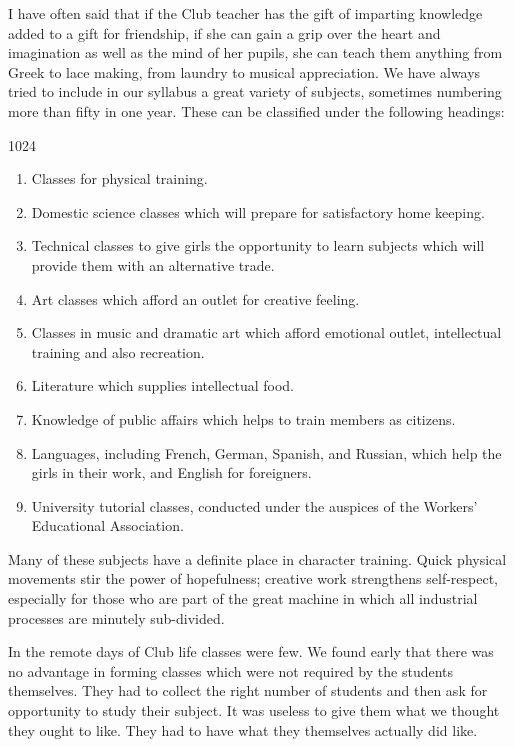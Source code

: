 I have often said that if the Club teacher has the gift
of imparting knowledge added to a gift for friendship, if
she can gain a grip over the heart and imagination as well
as the mind of her pupils, she can teach them anything
from Greek to lace making, from laundry to musical
appreciation. We have always tried to include in our
syllabus a great variety of subjects, sometimes numbering
more than fifty in one year. These can be classified
under the following headings:

\begin{tp}{1024}
\begin{enumerate}[(1)]
\item Classes for physical training.
\item Domestic science classes which will prepare for satisfactory home keeping.
\item Technical classes to give girls the opportunity to learn subjects which will provide them with an alternative trade.
\item Art classes which afford an outlet for creative feeling.
\item Classes in music and dramatic art which afford emotional outlet, intellectual training and also recreation.
\item Literature which supplies intellectual food.
\item Knowledge of public affairs which helps to train members as citizens.
\item Languages, including French, German, Spanish, and Russian, which help the girls in their work, and English for foreigners.
\item University tutorial  classes, conducted under the auspices of the Workers’ Educational Association.
\end{enumerate}
\end{tp}

Many of these subjects have a definite place in character
training. Quick physical movements stir the power of
hopefulness; creative work strengthens self-respect,
especially for those who are part of the great machine in
which all industrial processes are minutely sub-divided.

In the remote days of Club life classes were few. We
found early that there was no advantage in forming
classes which were not required by the students
themselves. They had to collect the right number of students
and then ask for opportunity to study their subject. It
was useless to give them what we thought they ought
to like. They had to have what they themselves actually
did like.


